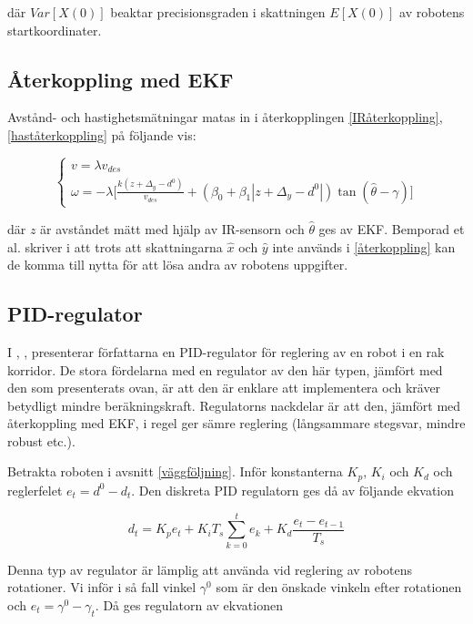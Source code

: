 \documentclass[11pt]{article}
\begin{document}
\begin{flushleft}
där $Var[X(0)]$ beaktar precisionsgraden i skattningen $E[X(0)]$ av robotens startkoordinater.

\subsection{Återkoppling med EKF}
Avstånd- och hastighetsmätningar matas in i återkopplingen \eqref{IRåterkoppling},  \eqref{haståterkoppling} på följande vis:

\begin{equation}\label{återkoppling}
	\begin{cases}
	v = \lambda v_{des} \\
	\omega = - \lambda \bigg[ \frac {k(z + \Delta_y - d^0)} {v_{des}} + (\beta_0 + \beta_1 | z + \Delta_y - d^0 |) \tan (\hat{\theta} - \gamma) \bigg]
	\end{cases}
\end{equation}

där $z$ är avståndet mätt med hjälp av IR-sensorn och $\hat{\theta}$ ges av EKF. Bemporad et al. skriver i \cite{wfp} att trots att skattningarna $\hat{x}$ och $\hat{y}$ inte används i \eqref{återkoppling} kan de komma till nytta för att lösa andra av robotens uppgifter.

\subsection{PID-regulator}
I \cite{PID1}, \cite{PID2}, \cite{PID3} presenterar författarna en PID-regulator för reglering av en robot i en rak korridor. De stora fördelarna med en regulator av den här typen, jämfört med den som presenterats ovan, är att den är enklare att implementera och kräver betydligt mindre beräkningskraft. Regulatorns nackdelar är att den, jämfört med återkoppling med EKF, i regel ger sämre reglering (långsammare stegsvar, mindre robust etc.).

Betrakta roboten i avsnitt \ref{väggföljning}. Inför konstanterna $K_p$, $K_i$ och $K_d$ och reglerfelet $e_t = d^0 - d_t$. Den diskreta PID regulatorn ges då av följande ekvation

\begin{equation}
	d_t = K_p e_t + K_i T_s \displaystyle\sum_{k=0}^{t} e_k + K_d \frac {e_t - e_{t-1}}{T_s}
\end{equation}

Denna typ av regulator är lämplig att använda vid reglering av robotens rotationer. Vi inför i så fall vinkel $\gamma^0$ som är den önskade vinkeln efter rotationen och $e_t = \gamma^0 - \gamma_t$. Då ges regulatorn av ekvationen 


\end{flushleft}
\end{document}
